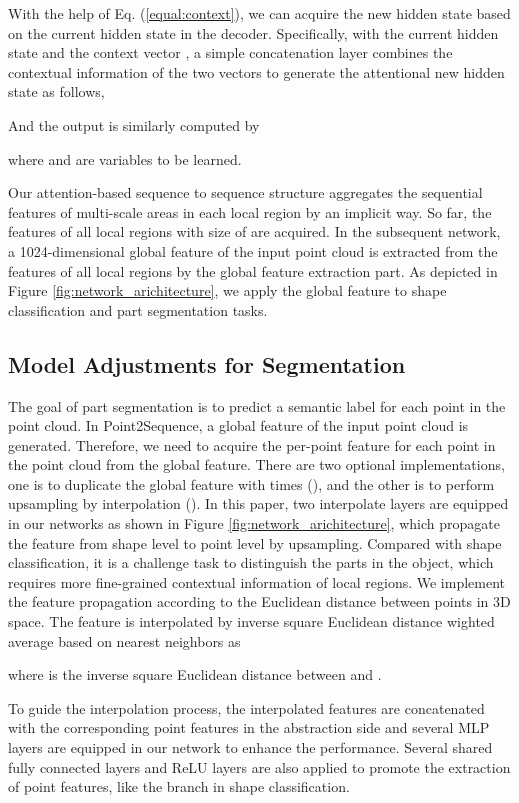 \documentclass[letterpaper]{article}
\begin{document}
With the help of Eq. (\ref{equal:context}), we can acquire the new hidden state  based on the current hidden state  in the decoder.
Specifically, with the current hidden state  and the context vector , a simple concatenation layer combines the  contextual information of the two vectors to generate the attentional new hidden state as follows,

And the output  is similarly computed by

where  and  are variables to be learned.

Our attention-based sequence to sequence structure aggregates the sequential features  of multi-scale areas in each local region  by an implicit way. So far, the features  of all local regions with size of  are acquired. 
In the subsequent network, a 1024-dimensional global feature  of the input point cloud is extracted from the features of all local regions by the global feature extraction part.
As depicted in Figure \ref{fig:network_arichitecture}, we apply the global feature  to shape classification and part segmentation tasks. 

\subsection{Model Adjustments for Segmentation}
The goal of part segmentation is to predict a semantic label for each point in the point cloud.
In Point2Sequence, a global feature of the input point cloud is generated.
Therefore, we need to acquire the per-point feature for each point in the point cloud from the global feature.
There are two optional implementations, one is to duplicate the global feature with  times (\citealt{qi2017pointnet,wang2018dynamic}), and the other is to perform upsampling by interpolation (\citealt{qi2017pointnet++,li2018so}).
In this paper, two interpolate layers are equipped in our networks as shown in Figure \ref{fig:network_arichitecture}, which propagate the feature from shape level to point level by upsampling.
Compared with shape classification, it is a challenge task to distinguish the parts in the object, which requires more fine-grained contextual information of local regions. 
We implement the feature  propagation according to the Euclidean distance between points in 3D space.
The feature is interpolated by inverse square Euclidean distance wighted average based on  nearest neighbors as

where   is the inverse square Euclidean distance between  and .

To guide the interpolation process, the interpolated features are concatenated with the corresponding point features in the abstraction side and several MLP layers are equipped in our network to enhance the performance.
Several shared fully connected layers and ReLU layers are also applied to promote the extraction of point features, like the branch in shape classification.
\end{document}
